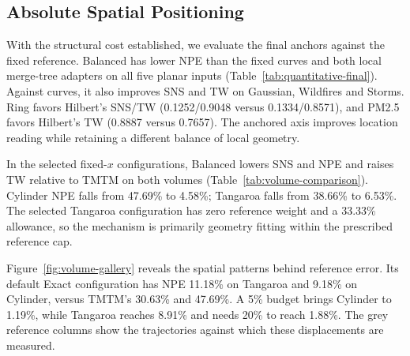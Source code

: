 \begin{figure}[!tb]
\end{figure}
\subsection{Absolute Spatial Positioning}\label{sec:reference-results}

With the structural cost established, we evaluate the final anchors against the fixed reference. Balanced has lower NPE than the fixed curves and both local merge-tree adapters on all five planar inputs (Table~\ref{tab:quantitative-final}). Against curves, it also improves SNS and TW on Gaussian, Wildfires and Storms. Ring favors Hilbert's SNS/TW (0.1252/0.9048 versus 0.1334/0.8571), and PM2.5 favors Hilbert's TW (0.8887 versus 0.7657). The anchored axis improves location reading while retaining a different balance of local geometry.


In the selected fixed-$x$ configurations, Balanced lowers SNS and NPE and raises TW relative to TMTM on both volumes (Table~\ref{tab:volume-comparison}). Cylinder NPE falls from 47.69\% to 4.58\%; Tangaroa falls from 38.66\% to 6.53\%. The selected Tangaroa configuration has zero reference weight and a 33.33\% allowance, so the mechanism is primarily geometry fitting within the prescribed reference cap.

Figure~\ref{fig:volume-gallery} reveals the spatial patterns behind reference error. Its default Exact configuration has NPE 11.18\% on Tangaroa and 9.18\% on Cylinder, versus TMTM's 30.63\% and 47.69\%. A 5\% budget brings Cylinder to 1.19\%, while Tangaroa reaches 8.91\% and needs 20\% to reach 1.88\%. The grey reference columns show the trajectories against which these displacements are measured.

\begin{figure}[!tb]
\end{figure}
